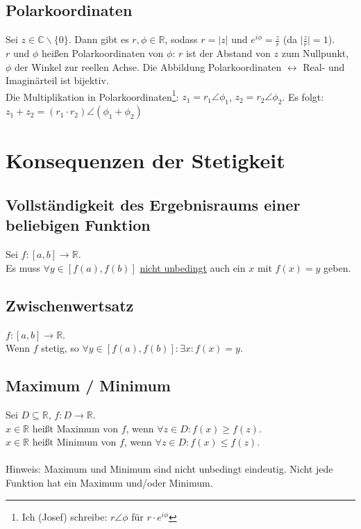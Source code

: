 \documentclass[halfparscip]{scrartcl}
\newcounter{subsection2}
\begin{document}
\subsection*{Polarkoordinaten}
Sei $z \in \mathbb{C} \backslash \{0\}$. Dann gibt es $r, \phi \in \mathbb{R}$, sodass $r = \vert z\vert$ und $e^{i\phi} = \frac{z}{r}$ (da $\vert\frac{z}{r}\vert = 1$).\\
$r$ und $\phi$ heißen Polarkoordinaten von $\phi$: $r$ ist der Abstand von $z$ zum Nullpunkt, $\phi$ der Winkel zur reellen Achse. Die Abbildung Polarkoordinaten $\leftrightarrow$ Real- und Imaginärteil ist bijektiv.\\
Die Multiplikation in Polarkoordinaten\footnote{Ich (Josef) schreibe: $r \angle \phi$ für $r \cdot e^{i\phi}$}: $z_1 = r_1 \angle \phi_1$, $z_2 = r_2 \angle \phi_2$. Es folgt: $z_1 + z_2 = (r_1\cdot r_2) \angle (\phi_1 + \phi_2)$

\newpage
\section{Konsequenzen der Stetigkeit}
\subsection{\glqq Vollständigkeit\grqq{} des Ergebnisraums einer beliebigen Funktion}
Sei $f : [a,b] \rightarrow \mathbb{R}$.\\
Es muss $\forall y \in [f(a), f(b)]$ \underline{nicht unbedingt} auch ein $x$ mit $f(x) = y$ geben.

\subsection{Zwischenwertsatz}
$f : [a,b] \rightarrow \mathbb{R}$.\\
Wenn $f$ stetig, so $\forall y\in[f(a), f(b)]: \exists x : f(x) = y$.

\subsection{Maximum / Minimum}
Sei $D \subseteq \mathbb{R}$, $f : D \rightarrow \mathbb{R}$.\\
$x \in \mathbb{R}$ heißt Maximum von $f$, wenn $\forall z \in D: f(x) \geq f(z)$.\\
$x \in \mathbb{R}$ heißt Minimum von $f$, wenn $\forall z \in D: f(x) \leq f(z)$.\\\\
Hinweis: Maximum und Minimum sind nicht unbedingt eindeutig. Nicht jede Funktion hat ein Maximum und/oder Minimum.
\end{document}
